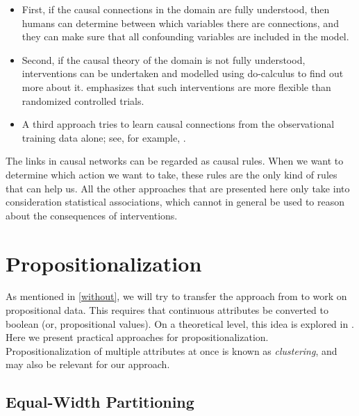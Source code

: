 \begin{enumerate}
\begin{itemize}
    \item First, if the causal connections in the domain are fully understood, then humans can determine between which variables there are connections, and they can make sure that all confounding variables are included in the model.
    \item Second, if the causal theory of the domain is not fully understood, interventions can be undertaken and modelled using do-calculus to find out more about it. \citet{pearlCausalInferenceStatistics2016} emphasizes that such interventions are more flexible than randomized controlled trials.
    \item A third approach tries to learn causal connections from the observational training data alone; see, for example, \cite{wallaceCausalDiscoveryMML1996}.
\end{itemize}
\end{enumerate}

The links in causal networks can be regarded as causal rules. When we want to determine which action we want to take, these rules are the only kind of rules that can help us. All the other approaches that are presented here only take into consideration statistical associations, which cannot in general be used to reason about the consequences of interventions.


\section{Propositionalization}

As mentioned in \autoref{without}, we will try to transfer the approach from \citet{verheijProofProbabilities2017} to work on propositional data. This requires that continuous attributes be converted to boolean (or, propositional values). On a theoretical level, this idea is explored in \citet{deraedtLogicalRelationalLearning2008}. Here we present practical approaches for propositionalization. Propositionalization of multiple attributes at once is known as \textit{clustering}, and may also be relevant for our approach.

\subsection{Equal-Width Partitioning}

